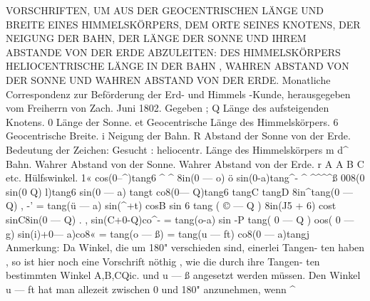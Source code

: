 \documentclass[12pt,a4paper]{article}
\begin{document}
VORSCHRIFTEN,  UM  AUS  DER  GEOCENTRISCHEN  LÄNGE  UND  BREITE  EINES
HIMMELSKÖRPERS,  DEM  ORTE  SEINES  KNOTENS,  DER  NEIGUNG  DER  BAHN,  DER  LÄNGE
DER  SONNE  UND  IHREM  ABSTANDE  VON  DER  ERDE  ABZULEITEN:
DES  HIMMELSKÖRPERS  HELIOCENTRISCHE  LÄNGE  IN  DER  BAHN ,  WAHREN  ABSTAND
VON  DER  SONNE  UND  WAHREN  ABSTAND  VON  DER  ERDE.
Monatliche  Correspondenz  zur  Beförderung  der  Erd-  und  Himmels -Kunde,
herausgegeben  vom  Freiherrn  von  Zach.     Juni  1802.
Gegeben ;
Q  Länge  des  aufsteigenden  Knotens.
0  Länge  der  Sonne.
et     Geocentrische  Länge  des  Himmelskörpers.
6     Geocentrische  Breite.
i     Neigung  der  Bahn.
R  Abstand  der  Sonne  von  der  Erde.
Bedeutung  der  Zeichen:
Gesucht  :
heliocentr.   Länge   des  Himmelskörpers  m  d\^{}
Bahn.
Wahrer  Abstand  von  der  Sonne.
Wahrer  Abstand  von  der  Erde.
r
A
A
B
C  etc.
Hülfswinkel.
1«  cos(0--\^{})tang6  \^{}  \^{}
8in(0  ---  o)  ö
sin(0-a)tang\^{}-    \^{}  \^{}\^{}\^{}\^{}ß
008(0
sin(0
Q)
l)tang6
sin(0 ---  a)  tangt
co8(0--- Q)tang6
tangC
tangD
8in\^{}tang(0  --- Q)  ,
-'  =  tang(ü  --- a)
sin(\^{}+t)
cosB  sin  6  tang  ( ©  ---  Q )
8in(J5  +  6)  cost
sinC8in(0  --- Q)  .  ,
sin(C+0-Q)co\^{}-  =  tang(o-a)
sin  -P  tang(  0  ---  Q )  oos(  0  ---  g)
sin(i)+0--- a)co8«
=  tang(o  --- ß)
=  tang(u  --- ft)
co8(0 --- a)tangj
Anmerkung:  Da  Winkel,  die  um  180"  verschieden  sind,  einerlei  Tangen-
ten haben ,  so  ist  hier  noch  eine  Vorschrift  nöthig ,  wie  die  durch  ihre  Tangen-
ten bestimmten  Winkel  A,B,CQic.  und  u  ---  ß  angesetzt  werden  müssen.  Den
Winkel   u  ---  ft    hat  man  allezeit  zwischen    0  und    180"   anzunehmen,   wenn  \^{}

\newpage
\end{document}
